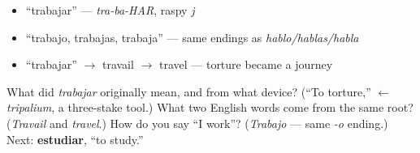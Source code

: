 \begin{itemize}
\raggedright
  \item \textquotedblleft{}trabajar\textquotedblright{} — \emph{tra-ba-HAR}, raspy \emph{j}
  \item \textquotedblleft{}trabajo, trabajas, trabaja\textquotedblright{} — same endings as \emph{hablo/hablas/habla}
  \item \textquotedblleft{}trabajar\textquotedblright{} $\to$ travail $\to$ travel — torture became a journey
\end{itemize}

\begin{tcolorbox}[breakable,colback=teal!4,colframe=teal!35!black,title={Before you move on}]
What did \emph{trabajar} originally mean, and from what device? (\textquotedblleft{}To torture,\textquotedblright{} $\leftarrow$ \emph{tripalium}, a three-stake tool.) What two English words come from the same root? (\emph{Travail} and \emph{travel}.) How do you say \textquotedblleft{}I work\textquotedblright{}? (\emph{Trabajo} — same \emph{-o} ending.) Next: \textbf{estudiar}, \textquotedblleft{}to study.\textquotedblright{}
\end{tcolorbox}

